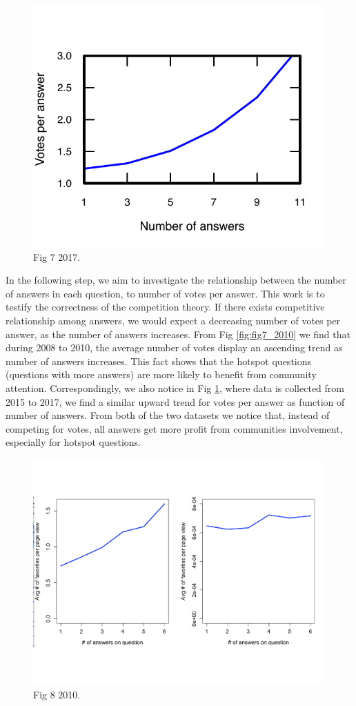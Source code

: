 \begin{figure}[!t]
	\centering
	\includegraphics[width=0.8\columnwidth]{img/Fig7_2017.pdf}
	\caption{Fig 7 2017.}
	\label{fig:fig7_2017}
\end{figure}
In the following step, we aim to investigate the relationship between the number of answers in each question, to number of votes per answer. This work is to testify the correctness of the competition theory. If there exists competitive relationship among answers, we would expect a decreasing number of votes per answer, as the number of answers increases. From Fig \ref{fig:fig7_2010} we find that during 2008 to 2010, the average number of votes display an ascending trend as number of answers increases. This fact shows that the hotspot questions (questions with more answers) are more likely to benefit from community attention. Correspondingly, we also notice in Fig \ref{fig:fig7_2017}, where data is collected from 2015 to 2017, we find a similar upward trend for votes per answer as function of number of answers. From both of the two datasets we notice that, instead of competing for votes, all answers get more profit from communities involvement, especially for hotspot questions. 

\begin{figure}[!t]
	\centering
	\includegraphics[width=0.8\columnwidth]{img/Fig8_2010.pdf}
	\caption{Fig 8 2010.}
	\label{fig:fig8_2010}
\end{figure}

